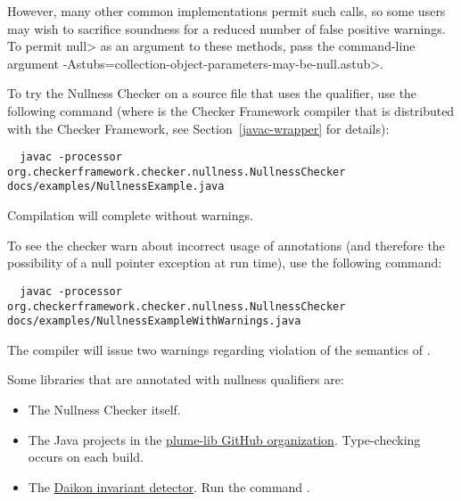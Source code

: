 However, many other common implementations permit such calls, so some users
may wish to sacrifice soundness for a reduced number of false positive
warnings.  To permit \<null> as an argument to these methods, pass the
command-line argument
\<-Astubs=collection-object-parameters-may-be-null.astub>.




To try the Nullness Checker on a source file that uses the  qualifier,
use the following command (where  is the Checker Framework compiler that
is distributed with the Checker Framework, see Section~\ref{javac-wrapper}
for details):

\begin{smaller}
\begin{Verbatim}
  javac -processor org.checkerframework.checker.nullness.NullnessChecker docs/examples/NullnessExample.java
\end{Verbatim}
\end{smaller}

\noindent
Compilation will complete without warnings.

To see the checker warn about incorrect usage of annotations (and therefore the
possibility of a null pointer exception at run time), use the following command:

\begin{mysmall}
\begin{Verbatim}
  javac -processor org.checkerframework.checker.nullness.NullnessChecker docs/examples/NullnessExampleWithWarnings.java
\end{Verbatim}
\end{mysmall}


\noindent
The compiler will issue two warnings regarding violation of the semantics of
.



Some libraries that are annotated with nullness qualifiers are:

\begin{itemize}
\item
The Nullness Checker itself.

\item
The Java projects in the \href{https://github.com/plume-lib/}
{plume-lib GitHub organization}.
Type-checking occurs on each build.

\item
The
\href{http://plse.cs.washington.edu/daikon/}{Daikon invariant detector}.
Run the command .

\end{itemize}


